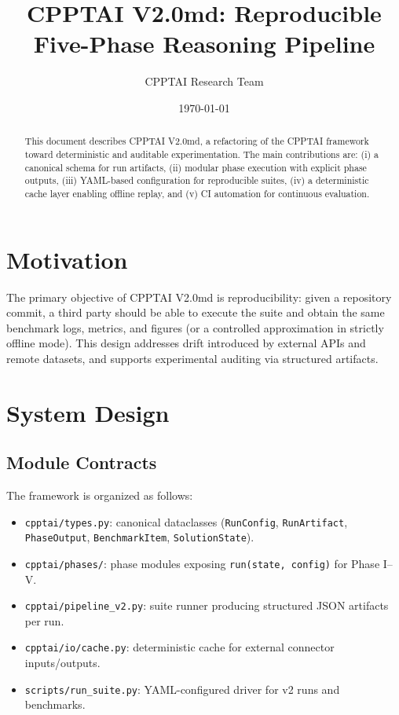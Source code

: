 \documentclass[11pt]{article}
\title{CPPTAI V2.0md: Reproducible Five-Phase Reasoning Pipeline}
\author{CPPTAI Research Team}
\date{\today}
\begin{document}
\maketitle

\begin{abstract}
This document describes CPPTAI V2.0md, a refactoring of the CPPTAI framework toward deterministic and auditable experimentation. The main contributions are: (i) a canonical schema for run artifacts, (ii) modular phase execution with explicit phase outputs, (iii) YAML-based configuration for reproducible suites, (iv) a deterministic cache layer enabling offline replay, and (v) CI automation for continuous evaluation.
\end{abstract}

\section{Motivation}
The primary objective of CPPTAI V2.0md is reproducibility: given a repository commit, a third party should be able to execute the suite and obtain the same benchmark logs, metrics, and figures (or a controlled approximation in strictly offline mode). This design addresses drift introduced by external APIs and remote datasets, and supports experimental auditing via structured artifacts.

\section{System Design}
\subsection{Module Contracts}
The framework is organized as follows:
\begin{itemize}
  \item \texttt{cpptai/types.py}: canonical dataclasses (\texttt{RunConfig}, \texttt{RunArtifact}, \texttt{PhaseOutput}, \texttt{BenchmarkItem}, \texttt{SolutionState}).
  \item \texttt{cpptai/phases/}: phase modules exposing \texttt{run(state, config)} for Phase I--V.
  \item \texttt{cpptai/pipeline\_v2.py}: suite runner producing structured JSON artifacts per run.
  \item \texttt{cpptai/io/cache.py}: deterministic cache for external connector inputs/outputs.
  \item \texttt{scripts/run\_suite.py}: YAML-configured driver for v2 runs and benchmarks.
\end{itemize}
\end{document}
